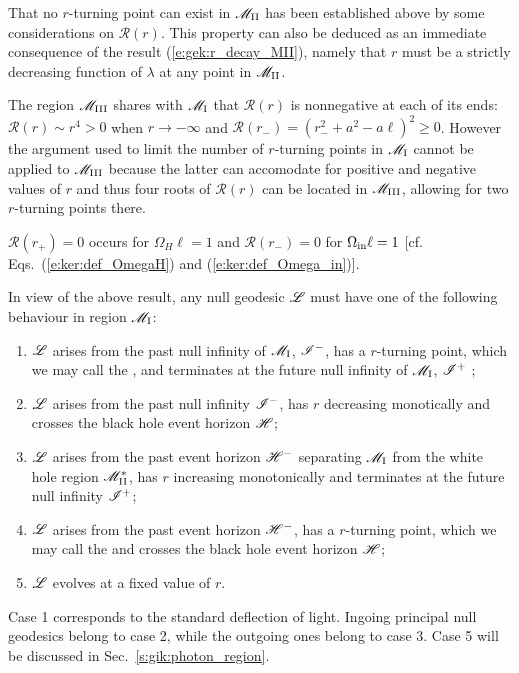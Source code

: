 \begin{remark}
That no $r$-turning point can exist in $\mathscr{M}_{\rm II}$ has been established
above by some considerations on $\mathcal{R}(r)$. This property can also be deduced as
an immediate consequence of the result (\ref{e:gek:r_decay_MII}), namely
that $r$ must be a strictly decreasing function of $\lambda$ at any point
in $\mathscr{M}_{\rm II}$.
\end{remark}


\begin{remark}
The region $\mathscr{M}_{\rm III}$ shares with $\mathscr{M}_{\rm I}$ that $\mathcal{R}(r)$ is
nonnegative at each of its ends: $\mathcal{R}(r) \sim r^4 > 0$ when $r\to -\infty$
and $\mathcal{R}(r_-) = (r_-^2 + a^2 - a \ell)^2 \geq 0$. However the argument
used to limit the number of $r$-turning points in $\mathscr{M}_{\rm I}$
cannot be applied to $\mathscr{M}_{\rm III}$ because the latter can accomodate for positive and negative
values of $r$ and thus four roots of $\mathcal{R}(r)$ can be located in $\mathscr{M}_{\rm III}$, allowing
for two $r$-turning points there.
\end{remark}


\begin{remark}
$\mathcal{R}(r_+) = 0$ occurs for $\Omega_H \ell = 1$
and $\mathcal{R}(r_-) = 0$ for $\Omega_{\rm in} \ell = 1$ [cf. Eqs.~(\ref{e:ker:def_OmegaH}) and (\ref {e:ker:def_Omega_in})].
\end{remark}


In view of the above result, any null geodesic $\mathscr{L}$ must have one of the following behaviour in
region $\mathscr{M}_{\rm I}$:
\begin{enumerate}
\item $\mathscr{L}$ arises from the past null infinity of $\mathscr{M}_{\rm I}$, $\mathscr{I}^-$, has a $r$-turning point,
which we may call the , and terminates at the future null infinity
of $\mathscr{M}_{\rm I}$, $\mathscr{I}^+$ ;
\item $\mathscr{L}$ arises from the past null infinity $\mathscr{I}^-$, has $r$ decreasing
monotically and crosses the black hole event horizon $\mathscr{H}$;
\item $\mathscr{L}$ arises from the past event horizon $\mathscr{H}^-$ separating $\mathscr{M}_{\rm I}$
from the white hole region $\mathscr{M}_{\rm II}^*$, has $r$ increasing monotonically and
terminates at the future null infinity $\mathscr{I}^+$;
\item $\mathscr{L}$ arises from the past event horizon $\mathscr{H}^-$, has a $r$-turning point,
which we may call the  and crosses the black hole event horizon $\mathscr{H}$;
\item $\mathscr{L}$ evolves at a fixed value of $r$.
\end{enumerate}
Case 1 corresponds to the standard deflection of light.
Ingoing principal null geodesics belong to case 2, while the outgoing ones belong to case 3.
Case 5 will be discussed in Sec.~\ref{s:gik:photon_region}.

